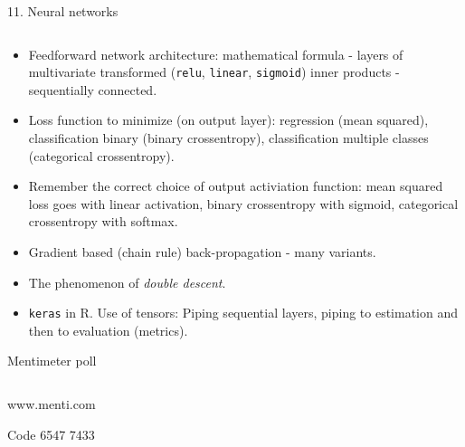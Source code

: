 \documentclass[10pt,ignorenonframetext,]{beamer}
\begin{document}
\begin{frame}[fragile]

\begin{block}{11. Neural networks}

\(~\)

\begin{itemize}
\item
  Feedforward network architecture: mathematical formula - layers of
  multivariate transformed (\texttt{relu}, \texttt{linear},
  \texttt{sigmoid}) inner products - sequentially connected.
  \vspace{2mm}
\item
  Loss function to minimize (on output layer): regression (mean
  squared), classification binary (binary crossentropy), classification
  multiple classes (categorical crossentropy). \vspace{2mm}
\item
  Remember the correct choice of output activiation function: mean
  squared loss goes with linear activation, binary crossentropy with
  sigmoid, categorical crossentropy with softmax. \vspace{2mm}
\item
  Gradient based (chain rule) back-propagation - many variants.
  \vspace{2mm}
\item
  The phenomenon of \emph{double descent}. \vspace{2mm}
\item
  \texttt{keras} in R. Use of tensors: Piping sequential layers, piping
  to estimation and then to evaluation (metrics).
\end{itemize}

\end{block}

\end{frame}

\begin{frame}{Mentimeter poll}
\protect\hypertarget{mentimeter-poll}{}

\(~\)

\centering

www.menti.com

Code 6547 7433

\end{frame}
\end{document}
